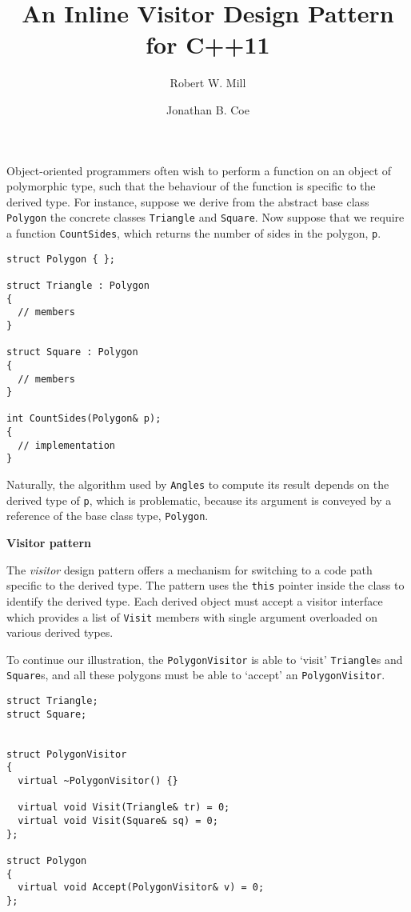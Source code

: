 \documentclass[10pt,a4paper,twocolumn]{article}
\title{An Inline Visitor Design Pattern for C++11}
\author{Robert W. Mill \and Jonathan B. Coe}
\renewcommand\section[1]{
    \begin{minipage}[c]{0.94\linewidth}
    \large \raggedright \sffamily \textbf{#1}
    \end{minipage}
}
\newcommand\mycode[1]{{\small\texttt{#1}}}
\begin{document}
\maketitle

Object-oriented programmers often wish to perform a function on an object of polymorphic type, such that the behaviour of the function is specific to the derived type. For instance, suppose we derive from the abstract base class \mycode{Polygon} the concrete classes \mycode{Triangle} and \mycode{Square}. Now suppose that we require a function \mycode{CountSides}, which returns the number of sides in the polygon, \mycode{p}.

{\small\begin{verbatim}
struct Polygon { };

struct Triangle : Polygon
{
  // members
}

struct Square : Polygon
{
  // members
}

int CountSides(Polygon& p);
{
  // implementation
}
\end{verbatim}}

Naturally, the algorithm used by \mycode{Angles} to compute its result depends on the derived type of \mycode{p}, which is problematic, because its argument is conveyed by a reference of the base class type, \mycode{Polygon}.

\section{Visitor pattern}

The \emph{visitor} design pattern offers a mechanism for switching to a code path specific to the derived type. The pattern uses the \mycode{this} pointer inside the class to identify the derived type. Each derived object must accept a visitor interface which provides a list of \mycode{Visit} members with single argument overloaded on various derived types.

To continue our illustration, the \mycode{PolygonVisitor} is able to `visit' \mycode{Triangle}s and \mycode{Square}s, and all these polygons must be able to `accept' an \mycode{PolygonVisitor}.

{\small\begin{verbatim}
struct Triangle;
struct Square;


struct PolygonVisitor
{
  virtual ~PolygonVisitor() {}

  virtual void Visit(Triangle& tr) = 0;
  virtual void Visit(Square& sq) = 0;
};

struct Polygon
{
  virtual void Accept(PolygonVisitor& v) = 0;
};
\end{verbatim}}
\end{document}
